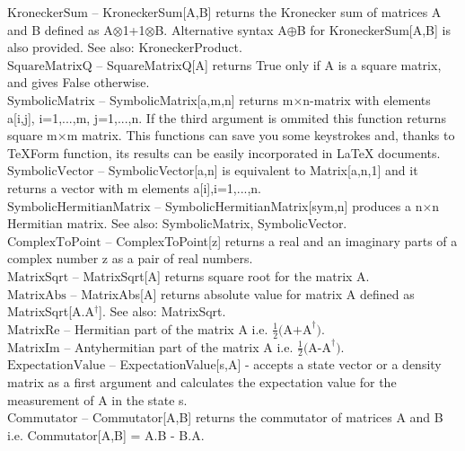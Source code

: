 \documentclass[a4paper,10pt]{scrartcl}
\begin{document}
\noindent\textbf{$ \text{KroneckerSum} $ }-- KroneckerSum[A,B] returns the Kronecker sum of matrices A and B defined as A$\otimes $1+1$\otimes $B. Alternative syntax A$\oplus $B for KroneckerSum[A,B] is also provided. See also: KroneckerProduct.$  $\\[8pt]
\noindent\textbf{$ \text{SquareMatrixQ} $ }-- SquareMatrixQ[A] returns True only if A is a square matrix, and gives False otherwise.$  $\\[8pt]
\noindent\textbf{$ \text{SymbolicMatrix} $ }-- SymbolicMatrix[a,m,n] returns m$\times $n-matrix with elements a[i,j], i=1,...,m, j=1,...,n. If the third argument is ommited this function returns square m$\times $m matrix. This functions can save you some keystrokes and, thanks to TeXForm function, its results can be easily incorporated in LaTeX documents.$  $\\[8pt]
\noindent\textbf{$ \text{SymbolicVector} $ }-- SymbolicVector[a,n] is equivalent to Matrix[a,n,1] and it returns a vector with m elements a[i],i=1,...,n.$  $\\[8pt]
\noindent\textbf{$ \text{SymbolicHermitianMatrix} $ }-- SymbolicHermitianMatrix[sym,n] produces a n$\times $n Hermitian matrix. See also: SymbolicMatrix, SymbolicVector.$  $\\[8pt]
\noindent\textbf{$ \text{ComplexToPoint} $ }-- ComplexToPoint[z] returns a real and an imaginary parts of a complex number z as a pair of real numbers.$  $\\[8pt]
\noindent\textbf{$ \text{MatrixSqrt} $ }-- MatrixSqrt[A] returns square root for the matrix A.$  $\\[8pt]
\noindent\textbf{$ \text{MatrixAbs} $ }-- MatrixAbs[A] returns absolute value for matrix A defined as MatrixSqrt[A.A$  ^{\dagger } $]. See also: MatrixSqrt.$  $\\[8pt]
\noindent\textbf{$ \text{MatrixRe} $ }-- Hermitian part of the matrix A i.e. $ \frac{1}{2}\text{(A+A} ^{\dagger }\text{).} $\\[8pt]
\noindent\textbf{$ \text{MatrixIm} $ }-- Antyhermitian part of the matrix A i.e. $ \frac{1}{2}\text{(A-A} ^{\dagger }\text{).} $\\[8pt]
\noindent\textbf{$ \text{ExpectationValue} $ }-- ExpectationValue[s,A] - accepts a state vector or a density matrix as a first argument and calculates the expectation value for the measurement of A in the state s.$  $\\[8pt]
\noindent\textbf{$ \text{Commutator} $ }-- Commutator[A,B] returns the commutator of matrices A and B i.e. Commutator[A,B] = A.B - B.A.$  $\\[8pt]
\end{document}
